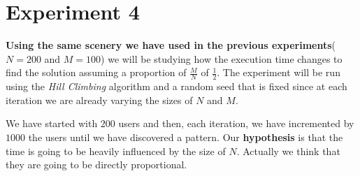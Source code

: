 \documentclass[12]{article}
\begin{document}
%
%
%            



\section{Experiment 4}
\textbf{Using the same scenery we have used in the previous experiments}($N=200$ and $M=100$) we will be studying how the execution time changes to find the solution  assuming a proportion of $\frac{M}{N}$ of $\frac{1}{2}$. The experiment will be run using the     
 \textit{Hill Climbing} algorithm and a random seed that is fixed since at each iteration we are already varying the sizes of $N$ and $M$.

We have started with $200$ users and then, each iteration, we have incremented by $1000$ the users until we have discovered a pattern. Our \textbf{hypothesis} is that the time is going to be heavily influenced by the size of $N$. Actually we think that they are going to be directly proportional. 
\end{document}
